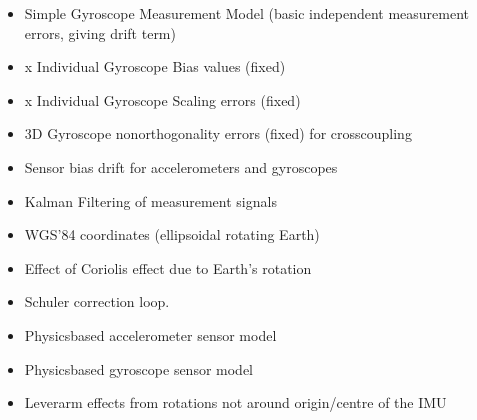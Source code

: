 \documentclass[letterpaper,10pt,english]{sphinxmanual}
\begin{document}
\begin{fulllineitems}
\begin{description}
\begin{itemize}
\item {} 
\sphinxAtStartPar
Simple Gyroscope Measurement Model (basic \sphinxhyphen{} independent
measurement errors, giving drift term)

\item {} 
 x Individual Gyroscope Bias values (fixed)

\item {} 
 x Individual Gyroscope Scaling errors (fixed)

\item {} 
\sphinxAtStartPar
3D Gyroscope non\sphinxhyphen{}orthogonality errors (fixed) for cross\sphinxhyphen{}coupling

\item {} 
\sphinxAtStartPar
Sensor bias drift for accelerometers and gyroscopes

\item {} 
\sphinxAtStartPar
Kalman Filtering of measurement signals

\item {} 
\sphinxAtStartPar
WGS’84 coordinates (ellipsoidal rotating Earth)

\item {} 
\sphinxAtStartPar
Effect of Coriolis effect due to Earth’s rotation

\end{itemize}

\begin{itemize}
\item {} 
\sphinxAtStartPar
Schuler correction loop.

\item {} 
\sphinxAtStartPar
Physics\sphinxhyphen{}based accelerometer sensor model

\item {} 
\sphinxAtStartPar
Physics\sphinxhyphen{}based gyroscope sensor model

\item {} 
\sphinxAtStartPar
Lever\sphinxhyphen{}arm effects from rotations not around origin/centre of the IMU

\end{itemize}

\end{description}


\end{fulllineitems}
\end{document}

